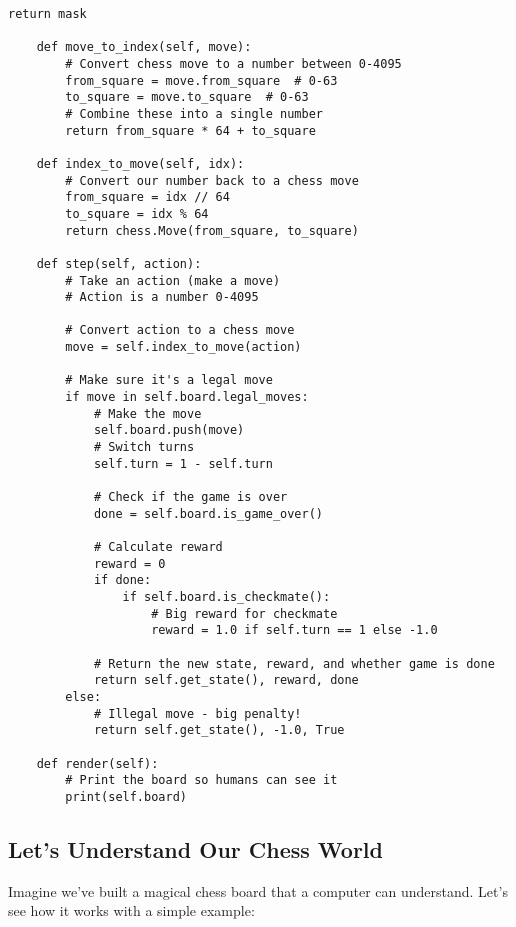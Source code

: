 \documentclass[11pt]{article}
\begin{document}
\begin{tcolorbox}[colback=green!5!white,colframe=green!75!black,title=Creating the Chess Environment]
\begin{lstlisting}[style=Python]
        return mask
    
    def move_to_index(self, move):
        # Convert chess move to a number between 0-4095
        from_square = move.from_square  # 0-63
        to_square = move.to_square  # 0-63
        # Combine these into a single number
        return from_square * 64 + to_square
    
    def index_to_move(self, idx):
        # Convert our number back to a chess move
        from_square = idx // 64
        to_square = idx % 64
        return chess.Move(from_square, to_square)
    
    def step(self, action):
        # Take an action (make a move)
        # Action is a number 0-4095
        
        # Convert action to a chess move
        move = self.index_to_move(action)
        
        # Make sure it's a legal move
        if move in self.board.legal_moves:
            # Make the move
            self.board.push(move)
            # Switch turns
            self.turn = 1 - self.turn
            
            # Check if the game is over
            done = self.board.is_game_over()
            
            # Calculate reward
            reward = 0
            if done:
                if self.board.is_checkmate():
                    # Big reward for checkmate
                    reward = 1.0 if self.turn == 1 else -1.0
                    
            # Return the new state, reward, and whether game is done
            return self.get_state(), reward, done
        else:
            # Illegal move - big penalty!
            return self.get_state(), -1.0, True

    def render(self):
        # Print the board so humans can see it
        print(self.board)
\end{lstlisting}
\end{tcolorbox}

\subsection{Let's Understand Our Chess World}

Imagine we've built a magical chess board that a computer can understand. Let's see how it works with a simple example:
\end{document}
